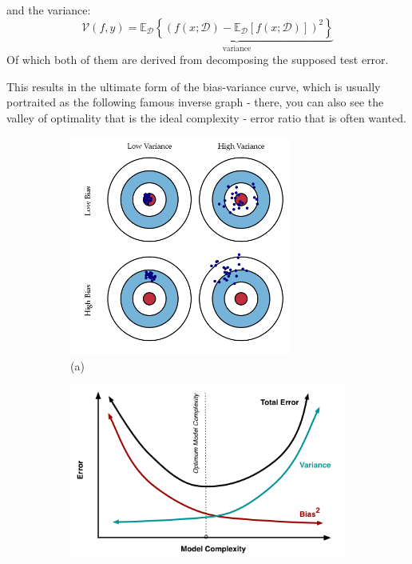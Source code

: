 and the variance: 
\begin{equation}
    \mathcal{V}(f,y) =\underbrace{\mathbb{E}_{\mathcal{D}} \left\{(f(x;\mathcal{D})- \mathbb{E}_{\mathcal{D}}[f(x;\mathcal{D})])^{2}\right\}}_{\text{variance}}
\end{equation}
Of which both of them are derived from decomposing the supposed test error. 

This results in the ultimate form of the bias-variance curve, which is usually portraited as the following famous inverse graph - there, you can also see the valley of optimality that is the ideal complexity - error ratio that is often wanted. 

\begin{figure}[h!]
    \centering
    \begin{subfigure}{0.4\textwidth}
      \centering
      \includegraphics[width=0.8\textwidth]{img/bias-variance_1.png}
      \caption*{(a)}
    \end{subfigure}
    \hspace{5mm}
    \begin{subfigure}{0.4\textwidth}
      \centering
      \includegraphics[width=1\textwidth]{img/biasvariance_2.png}

\end{subfigure}
\end{figure}
